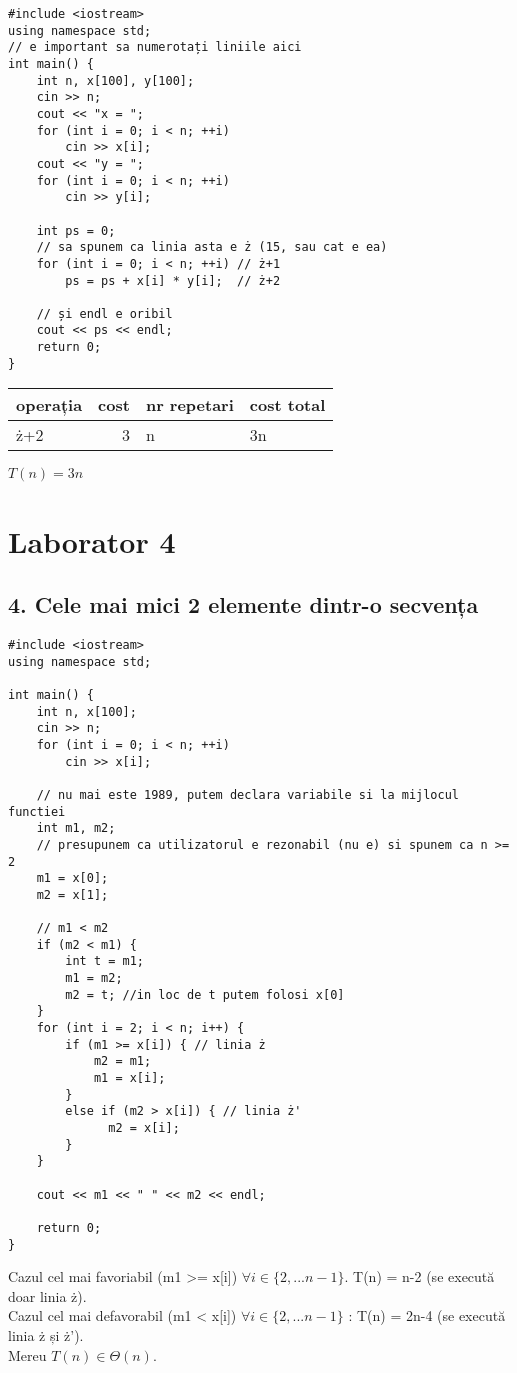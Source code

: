 \documentclass[11pt]{article}
\begin{document}
\begin{verbatim}
#include <iostream>
using namespace std;
// e important sa numerotați liniile aici
int main() {
    int n, x[100], y[100];
    cin >> n;
    cout << "x = ";
    for (int i = 0; i < n; ++i)
        cin >> x[i];
    cout << "y = ";
    for (int i = 0; i < n; ++i)
        cin >> y[i];

    int ps = 0;
    // sa spunem ca linia asta e ż (15, sau cat e ea)
    for (int i = 0; i < n; ++i) // ż+1
        ps = ps + x[i] * y[i];  // ż+2

    // și endl e oribil
    cout << ps << endl;
    return 0;
}
\end{verbatim}
\begin{center}
\begin{tabular}{lrll}
operația & cost & nr repetari & cost total\\
\hline
ż+2 & 3 & n & 3n\\
\end{tabular}
\end{center}

\(T(n) = 3n\)

\pagebreak
\section*{Laborator 4}
\label{sec:org0dba77a}
\subsection*{4. Cele mai mici 2 elemente dintr-o secvența}
\label{sec:org452142c}
\begin{verbatim}
#include <iostream>
using namespace std;

int main() {
    int n, x[100];
    cin >> n;
    for (int i = 0; i < n; ++i)
        cin >> x[i];

    // nu mai este 1989, putem declara variabile si la mijlocul functiei
    int m1, m2;
    // presupunem ca utilizatorul e rezonabil (nu e) si spunem ca n >= 2
    m1 = x[0];
    m2 = x[1];

    // m1 < m2
    if (m2 < m1) {
        int t = m1;
        m1 = m2;
        m2 = t; //in loc de t putem folosi x[0]
    }
    for (int i = 2; i < n; i++) {
        if (m1 >= x[i]) { // linia ż
            m2 = m1;
            m1 = x[i];
        }
        else if (m2 > x[i]) { // linia ż'
              m2 = x[i];
        }
    }

    cout << m1 << " " << m2 << endl;

    return 0;
}
\end{verbatim}
\noindent
Cazul cel mai favoriabil (m1 >= x[i]) \(\forall i \in \{2, ...n-1\}\). T(n) = n-2 (se execută doar linia ż). \\
Cazul cel mai defavorabil (m1 < x[i]) \(\forall i \in \{2, ...n-1\}\) : T(n) = 2n-4 (se execută linia ż și ż'). \\
Mereu \(T(n) \in \Theta(n)\).
\end{document}

